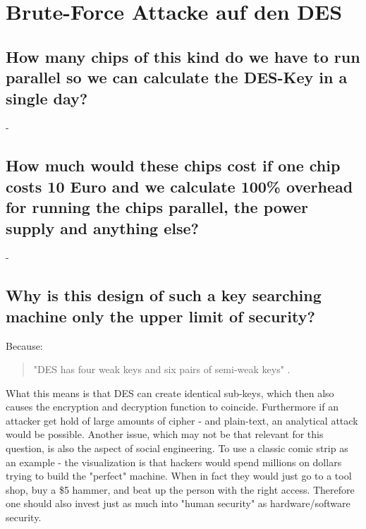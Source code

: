 \section{Brute-Force Attacke auf den DES}

\begin{comment}
An often used method to evaluate the security of an symmetric encryption algorithm against a bruteforce
attack is the calculation of the costs of constructing a key search machine. In the next exercise
we will have a look at this thematic.
Consider a DES-chip with internal parallel hardware structure that can perform a DES-encryption in
a single cycle(So it can test one key per cycle). We further assume that we can run the chips with a
frequency of 126 MHz.
\end{comment}

\subsection{How many chips of this kind do we have to run parallel so we can calculate the DES-Key in a single day?}
\label{section:5a}
- 

\subsection{How much would these chips cost if one chip costs 10 Euro and we calculate 100\% overhead for running the chips parallel, the power supply and anything else?}
\label{section:5b}
-
\subsection{Why is this design of such a key searching machine only the upper limit of security?}
\label{section:5c}
Because:
\begin{quote}
	"DES has four weak keys and six pairs of semi-weak keys" \cite[p.~257]{Menezes1997}.
\end{quote}
What this means is that DES can create identical sub-keys, which then also causes the encryption and decryption function to coincide. 
Furthermore if an attacker get hold of large amounts of cipher - and plain-text, an analytical attack would be possible.
\vspace{0.5em}\newline
Another issue, which may not be that relevant for this question, is also the aspect of social engineering.
To use a classic comic strip as an example - the visualization is that hackers would spend millions on dollars trying to build the "perfect" machine.
When in fact they would just go to a tool shop, buy a \$5 hammer, and beat up the person with the right access. 
Therefore one should also invest just as much into "human security" as hardware/software security.

